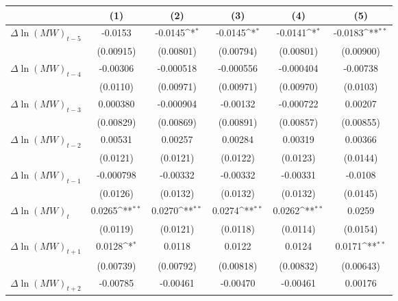 {
\def\sym#1{\ifmmode^{#1}\else\(^{#1}\)\fi}
\begin{tabular}{l*{5}{c}}
\hline\hline
          &\multicolumn{1}{c}{(1)}         &\multicolumn{1}{c}{(2)}         &\multicolumn{1}{c}{(3)}         &\multicolumn{1}{c}{(4)}         &\multicolumn{1}{c}{(5)}         \\
\hline
$\Delta \ln(MW)_{t-5}$&  -0.0153         &  -0.0145\sym{*}  &  -0.0145\sym{*}  &  -0.0141\sym{*}  &  -0.0183\sym{**} \\
          &(0.00915)         &(0.00801)         &(0.00794)         &(0.00801)         &(0.00900)         \\
[1em]
$\Delta \ln(MW)_{t-4}$& -0.00306         &-0.000518         &-0.000556         &-0.000404         & -0.00738         \\
          & (0.0110)         &(0.00971)         &(0.00971)         &(0.00970)         & (0.0103)         \\
[1em]
$\Delta \ln(MW)_{t-3}$& 0.000380         &-0.000904         & -0.00132         &-0.000722         &  0.00207         \\
          &(0.00829)         &(0.00869)         &(0.00891)         &(0.00857)         &(0.00855)         \\
[1em]
$\Delta \ln(MW)_{t-2}$&  0.00531         &  0.00257         &  0.00284         &  0.00319         &  0.00366         \\
          & (0.0121)         & (0.0121)         & (0.0122)         & (0.0123)         & (0.0144)         \\
[1em]
$\Delta \ln(MW)_{t-1}$&-0.000798         & -0.00332         & -0.00332         & -0.00331         &  -0.0108         \\
          & (0.0126)         & (0.0132)         & (0.0132)         & (0.0132)         & (0.0145)         \\
[1em]
$\Delta \ln(MW)_{t}$&   0.0265\sym{**} &   0.0270\sym{**} &   0.0274\sym{**} &   0.0262\sym{**} &   0.0259         \\
          & (0.0119)         & (0.0121)         & (0.0118)         & (0.0114)         & (0.0154)         \\
[1em]
$\Delta \ln(MW)_{t+1}$&   0.0128\sym{*}  &   0.0118         &   0.0122         &   0.0124         &   0.0171\sym{**} \\
          &(0.00739)         &(0.00792)         &(0.00818)         &(0.00832)         &(0.00643)         \\
[1em]
$\Delta \ln(MW)_{t+2}$& -0.00785         & -0.00461         & -0.00470         & -0.00461         &  0.00176         \\

\end{tabular}}
